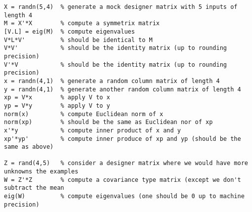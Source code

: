 \documentclass[11pt]{article}
\begin{document}
\begin{verbatim}
X = randn(5,4)  % generate a mock designer matrix with 5 inputs of length 4 
M = X'*X        % compute a symmetrix matrix
[V.L] = eig(M)  % compute eigenvalues
V*L*V'          % should be identical to M
V*V'            % should be the identity matrix (up to rounding precision)
V'*V            % should be the identity matrix (up to rounding precision)
x = randn(4,1)  % generate a random column matrix of length 4
y = randn(4,1)  % generate another random column matrix of length 4
xp = V*x        % apply V to x
yp = V*y        % apply V to y
norm(x)         % compute Euclidean norm of x
norm(xp)        % should be the same as Euclidean nor of xp
x'*y            % compute inner product of x and y
xp'*yp'         % compute inner produce of xp and yp (should be the same as above)

Z = rand(4,5)   % consider a designer matrix where we would have more unknowns the examples
W = Z'*Z        % compute a covariance type matrix (except we don't subtract the mean
eig(W)          % compute eigenvalues (one should be 0 up to machine precision)
\end{verbatim}
\end{document}
